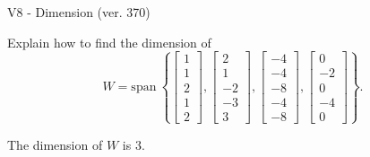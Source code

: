 \begin{exercise}
  \begin{exerciseTitle}V8 - Dimension (ver. 370)\end{exerciseTitle}
  \begin{exerciseStatement}
    Explain how to find the dimension of 
\[W=\mathrm{span}\ \left\{\left[\begin{array}{r}
1 \\
1 \\
2 \\
1 \\
2
\end{array}\right] , \left[\begin{array}{r}
2 \\
1 \\
-2 \\
-3 \\
3
\end{array}\right] , \left[\begin{array}{r}
-4 \\
-4 \\
-8 \\
-4 \\
-8
\end{array}\right] , \left[\begin{array}{r}
0 \\
-2 \\
0 \\
-4 \\
0
\end{array}\right]\right\}.\]



  \end{exerciseStatement}
  \begin{exerciseAnswer}
   The dimension of \(W\) is  \(3\).
  


  \end{exerciseAnswer}
\end{exercise}